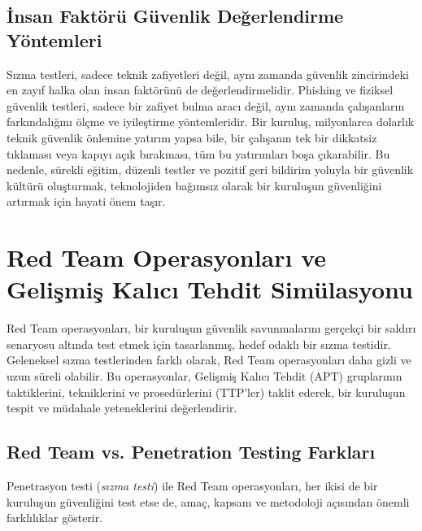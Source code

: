 \subsection{İnsan Faktörü Güvenlik Değerlendirme Yöntemleri}

Sızma testleri, sadece teknik zafiyetleri değil, aynı zamanda güvenlik zincirindeki en zayıf halka olan insan faktörünü de değerlendirmelidir. Phishing ve fiziksel güvenlik testleri, sadece bir zafiyet bulma aracı değil, aynı zamanda çalışanların farkındalığını ölçme ve iyileştirme yöntemleridir. Bir kuruluş, milyonlarca dolarlık teknik güvenlik önlemine yatırım yapsa bile, bir çalışanın tek bir dikkatsiz tıklaması veya kapıyı açık bırakması, tüm bu yatırımları boşa çıkarabilir. Bu nedenle, sürekli eğitim, düzenli testler ve pozitif geri bildirim yoluyla bir güvenlik kültürü oluşturmak, teknolojiden bağımsız olarak bir kuruluşun güvenliğini artırmak için hayati önem taşır.

\section{Red Team Operasyonları ve Gelişmiş Kalıcı Tehdit Simülasyonu}

Red Team operasyonları, bir kuruluşun güvenlik savunmalarını gerçekçi bir saldırı senaryosu altında test etmek için tasarlanmış, hedef odaklı bir sızma testidir. Geleneksel sızma testlerinden farklı olarak, Red Team operasyonları daha gizli ve uzun süreli olabilir. Bu operasyonlar, Gelişmiş Kalıcı Tehdit (APT) gruplarının taktiklerini, tekniklerini ve prosedürlerini (TTP'ler) taklit ederek, bir kuruluşun tespit ve müdahale yeteneklerini değerlendirir.

\subsection{Red Team vs. Penetration Testing Farkları}

Penetrasyon testi (\textit{sızma testi}) ile Red Team operasyonları, her ikisi de bir kuruluşun güvenliğini test etse de, amaç, kapsam ve metodoloji açısından önemli farklılıklar gösterir.

